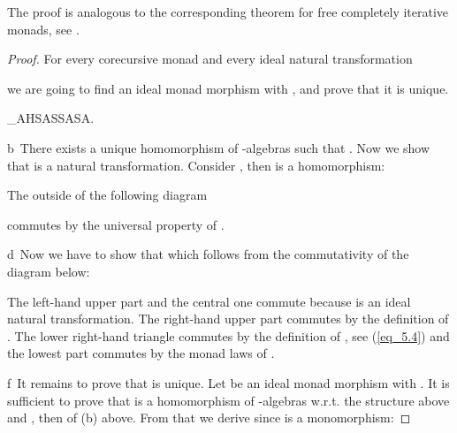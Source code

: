 \documentclass{LMCS}
\theoremstyle{plain}
\theoremstyle{definition}
\numberwithin{equation}{section}
\begin{document}
\begin{rem}
The proof is analogous to the corresponding theorem for free completely iterative monads, see \cite[Theorem~4.3]{m_cia}.
\end{rem}
\begin{proof}

For every corecursive monad  and every ideal natural transformation

we are going to find an ideal monad morphism
 with , and prove that it is unique.

\noindent\label{eq_5.4}
\rho_A\equiv HSA\longrightarrow SSA\longrightarrow SA.

b\ There exists a unique homomorphism  of -algebras such that . Now we show that  is a natural transformation. Consider , then  is a homomorphism:

The outside of the following diagram

commutes by the  universal property of .\medskip

\noindent
{}

d\ Now we have to show that  which follows from the commutativity of the diagram below:

The left-hand upper part and the central one commute because  is an ideal natural transformation. The right-hand upper part commutes by the definition of . The lower right-hand triangle commutes by the definition of , see (\ref{eq_5.4}) and the lowest part commutes by the monad laws of .\medskip

\noindent
{}
f\ It remains to prove that  is
unique. Let  be
an ideal monad morphism with . It is
sufficient to prove that  is a
homomorphism of -algebras w.r.t. the structure  above and
, then  of (b)
above. From that we derive  since  is
a monomorphism:


\end{proof}
\end{document}
